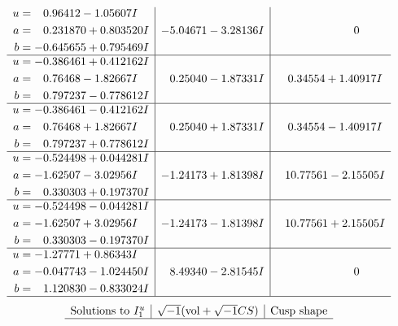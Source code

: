 \documentclass[1p]{elsarticle_modified}
\theoremstyle{definition}
\newcommand{\I}{\sqrt{-1}}
\begin{document}
$$\begin{array}{c|c|c}
\begin{aligned}
u &= \phantom{-}0.96412 - 1.05607 I \\
a &= \phantom{-}0.231870 + 0.803520 I \\
b &= -0.645655 + 0.795469 I\end{aligned}
 & -5.04671 - 3.28136 I & \phantom{-0.000000 } 0 \\ \hline\begin{aligned}
u &= -0.386461 + 0.412162 I \\
a &= \phantom{-}0.76468 - 1.82667 I \\
b &= \phantom{-}0.797237 - 0.778612 I\end{aligned}
 & \phantom{-}0.25040 - 1.87331 I & \phantom{-}0.34554 + 1.40917 I \\ \hline\begin{aligned}
u &= -0.386461 - 0.412162 I \\
a &= \phantom{-}0.76468 + 1.82667 I \\
b &= \phantom{-}0.797237 + 0.778612 I\end{aligned}
 & \phantom{-}0.25040 + 1.87331 I & \phantom{-}0.34554 - 1.40917 I \\ \hline\begin{aligned}
u &= -0.524498 + 0.044281 I \\
a &= -1.62507 - 3.02956 I \\
b &= \phantom{-}0.330303 + 0.197370 I\end{aligned}
 & -1.24173 + 1.81398 I & \phantom{-}10.77561 - 2.15505 I \\ \hline\begin{aligned}
u &= -0.524498 - 0.044281 I \\
a &= -1.62507 + 3.02956 I \\
b &= \phantom{-}0.330303 - 0.197370 I\end{aligned}
 & -1.24173 - 1.81398 I & \phantom{-}10.77561 + 2.15505 I \\ \hline\begin{aligned}
u &= -1.27771 + 0.86343 I \\
a &= -0.047743 - 1.024450 I \\
b &= \phantom{-}1.120830 - 0.833024 I\end{aligned}
 & \phantom{-}8.49340 - 2.81545 I & \phantom{-0.000000 } 0\\
 \hline 
 \end{array}$$\newpage$$\begin{array}{c|c|c}  
\text{Solutions to }I^u_{1}& \I (\text{vol} + \sqrt{-1}CS) & \text{Cusp shape}\\
 \hline 

\end{array}$$
\end{document}
